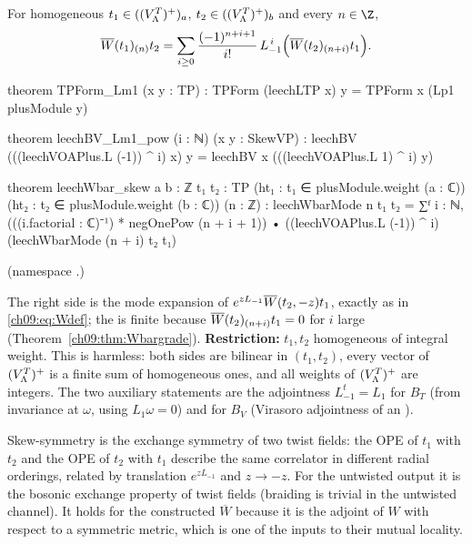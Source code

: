 \begin{theorem}\label{ch09:thm:skew}
For homogeneous $t_1\in((V_{\Lambda}^{T})^{+})_a$, $t_2\in((V_{\Lambda}^{T})^{+})_b$ and every $n\in\Z$,
\begin{equation*}
\overline{W}(t_1)_{(n)}t_2=\sum_{i\ge0}\frac{(-1)^{n+i+1}}{i!}\,L_{-1}^{\,i}\Big(\overline{W}(t_2)_{(n+i)}t_1\Big).
\end{equation*}
\end{theorem}
\begin{leancode}
theorem TPForm_Lm1 (x y : TP) : TPForm (leechLTP x) y = TPForm x (Lp1 plusModule y)

theorem leechBV_Lm1_pow (i : ℕ) (x y : SkewVP) :
    leechBV (((leechVOAPlus.L (-1)) ^ i) x) y = leechBV x (((leechVOAPlus.L 1) ^ i) y)

theorem leechWbar_skew {a b : ℤ} {t₁ t₂ : TP} (ht₁ : t₁ ∈ plusModule.weight (a : ℂ))
    (ht₂ : t₂ ∈ plusModule.weight (b : ℂ)) (n : ℤ) :
    leechWbarMode n t₁ t₂ = ∑ᶠ i : ℕ, (((i.factorial : ℂ)⁻¹) * negOnePow (n + i + 1)) •
      ((leechVOAPlus.L (-1)) ^ i) (leechWbarMode (n + i) t₂ t₁)
\end{leancode}
(namespace .)
\begin{dictionary}
The right side is the mode expansion of $e^{zL_{-1}}\overline{W}(t_2,-z)t_1$, exactly as in
\eqref{ch09:eq:Wdef}; the  is finite because $\overline{W}(t_2)_{(n+i)}t_1=0$ for $i$ large
(Theorem~\ref{ch09:thm:Wbargrade}). \textbf{Restriction:} $t_1,t_2$ homogeneous of integral weight.
This is harmless: both sides are bilinear in $(t_1,t_2)$, every vector of $(V_{\Lambda}^{T})^{+}$ is a finite sum
of homogeneous ones, and all weights of $(V_{\Lambda}^{T})^{+}$ are integers. The two auxiliary statements are
the adjointness $L_{-1}^t=L_1$ for $B_T$ (from invariance at $\omega$, using $L_1\omega=0$) and for
$B_V$ (Virasoro adjointness of an ).
\end{dictionary}

\begin{physics}
Skew-symmetry is the exchange symmetry of two twist fields: the OPE of $t_1$ with $t_2$ and the OPE of $t_2$ with $t_1$ describe the same correlator in different radial orderings, related by translation $e^{zL_{-1}}$ and $z\to-z$. For the untwisted output it is the bosonic exchange property of twist fields (braiding is trivial in the untwisted channel). It holds for the constructed $\overline W$ because it is the adjoint of $W$ with respect to a symmetric metric, which is one of the inputs to their mutual locality.
\end{physics}

